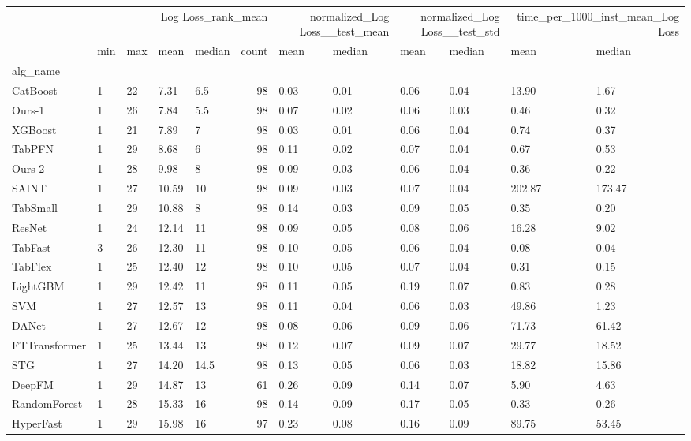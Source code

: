 \begin{tabular}{lllllrllllll}
\toprule
 & \multicolumn{5}{r}{Log Loss_rank_mean} & \multicolumn{2}{r}{normalized_Log Loss__test_mean} & \multicolumn{2}{r}{normalized_Log Loss__test_std} & \multicolumn{2}{r}{time_per_1000_inst_mean_Log Loss} \\
 & min & max & mean & median & count & mean & median & mean & median & mean & median \\
alg_name &  &  &  &  &  &  &  &  &  &  &  \\
\midrule
CatBoost & 1 & 22 & 7.31 & 6.5 & 98 & 0.03 & 0.01 & 0.06 & 0.04 & 13.90 & 1.67 \\
Ours-1 & 1 & 26 & 7.84 & 5.5 & 98 & 0.07 & 0.02 & 0.06 & 0.03 & 0.46 & 0.32 \\
XGBoost & 1 & 21 & 7.89 & 7 & 98 & 0.03 & 0.01 & 0.06 & 0.04 & 0.74 & 0.37 \\
TabPFN & 1 & 29 & 8.68 & 6 & 98 & 0.11 & 0.02 & 0.07 & 0.04 & 0.67 & 0.53 \\
Ours-2 & 1 & 28 & 9.98 & 8 & 98 & 0.09 & 0.03 & 0.06 & 0.04 & 0.36 & 0.22 \\
SAINT & 1 & 27 & 10.59 & 10 & 98 & 0.09 & 0.03 & 0.07 & 0.04 & 202.87 & 173.47 \\
TabSmall & 1 & 29 & 10.88 & 8 & 98 & 0.14 & 0.03 & 0.09 & 0.05 & 0.35 & 0.20 \\
ResNet & 1 & 24 & 12.14 & 11 & 98 & 0.09 & 0.05 & 0.08 & 0.06 & 16.28 & 9.02 \\
TabFast & 3 & 26 & 12.30 & 11 & 98 & 0.10 & 0.05 & 0.06 & 0.04 & 0.08 & 0.04 \\
TabFlex & 1 & 25 & 12.40 & 12 & 98 & 0.10 & 0.05 & 0.07 & 0.04 & 0.31 & 0.15 \\
LightGBM & 1 & 29 & 12.42 & 11 & 98 & 0.11 & 0.05 & 0.19 & 0.07 & 0.83 & 0.28 \\
SVM & 1 & 27 & 12.57 & 13 & 98 & 0.11 & 0.04 & 0.06 & 0.03 & 49.86 & 1.23 \\
DANet & 1 & 27 & 12.67 & 12 & 98 & 0.08 & 0.06 & 0.09 & 0.06 & 71.73 & 61.42 \\
FTTransformer & 1 & 25 & 13.44 & 13 & 98 & 0.12 & 0.07 & 0.09 & 0.07 & 29.77 & 18.52 \\
STG & 1 & 27 & 14.20 & 14.5 & 98 & 0.13 & 0.05 & 0.06 & 0.03 & 18.82 & 15.86 \\
DeepFM & 1 & 29 & 14.87 & 13 & 61 & 0.26 & 0.09 & 0.14 & 0.07 & 5.90 & 4.63 \\
RandomForest & 1 & 28 & 15.33 & 16 & 98 & 0.14 & 0.09 & 0.17 & 0.05 & 0.33 & 0.26 \\
HyperFast & 1 & 29 & 15.98 & 16 & 97 & 0.23 & 0.08 & 0.16 & 0.09 & 89.75 & 53.45 \\

\end{tabular}
